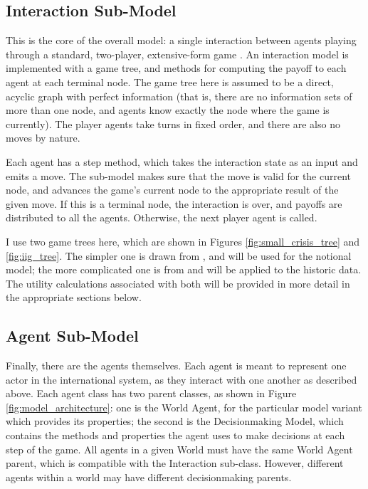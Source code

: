 \subsection{Interaction Sub-Model}

This is the core of the overall model: a single interaction between agents playing through a standard, two-player, extensive-form game \citep{shoham_2009}. An interaction model is implemented with a game tree, and methods for computing the payoff to each agent at each terminal node. The game tree here is assumed to be a direct, acyclic graph with perfect information (that is, there are no information sets of more than one node, and agents know exactly the node where the game is currently). The player agents take turns in fixed order, and there are also no moves by nature.

Each agent has a step method, which takes the interaction state as an input and emits a move. The sub-model makes sure that the move is valid for the current node, and advances the game's current node to the appropriate result of the given move. If this is a terminal node, the interaction is over, and payoffs are distributed to all the agents. Otherwise, the next player agent is called.

I use two game trees here, which are shown in Figures \ref{fig:small_crisis_tree} and \ref{fig:iig_tree}. The simpler one is drawn from \citet{signorino_1999}, and will be used for the notional model; the more complicated one is from \citet{bdm_1992} and will be applied to the historic data. The utility calculations associated with both will be provided in more detail in the appropriate sections below.

\subsection{Agent Sub-Model}

Finally, there are the agents themselves. Each agent is meant to represent one actor in the international system, as they interact with one another as described above. Each agent class has two parent classes, as shown in Figure \ref{fig:model_architecture}: one is the World Agent, for the particular model variant which provides its properties; the second is the Decisionmaking Model, which contains the methods and properties the agent uses to make decisions at each step of the game. All agents in a given World must have the same World Agent parent, which is compatible with the Interaction sub-class. However, different agents within a world may have different decisionmaking parents.

